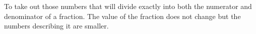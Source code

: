 To take out those numbers that will divide exactly into both the numerator and denominator
of a fraction.  The value of the fraction does not change but the numbers describing it 
are smaller.